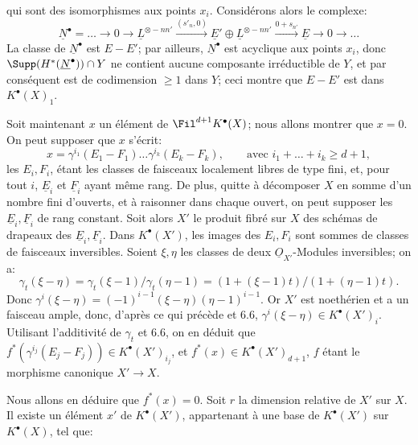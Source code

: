 
qui
sont des isomorphismes aux points $x_i$. Considérons alors le complexe:
\[
  \underline{N}^\bullet=\ldots\to0\to \underline{L}^{\otimes -nn'}
    \xrightarrow{(s'_n,0)} \underline{E}'\oplus \underline{L}^{\otimes -nn'}
    \xrightarrow{0+s_{n'}} \underline{E}\to0\to\ldots
\]
La classe de $\underline{N}^\bullet$ est $E-E'$; par ailleurs, $\underline{N}^\bullet$ est acyclique aux points $x_i$, donc $\Supp(H^*(\underline{N}^\bullet))\cap Y$ ne contient aucune composante irréductible de $Y$, et par conséquent est de codimension $\ge1$ dans $Y$; ceci montre que $E-E'$ est dans $K^{\bullet}(X)_1$.

Soit maintenant $x$ un élément de $\Fil^{d+1}K^{\bullet}(X)$; nous allons montrer que $x=0$. On peut supposer que $x$ s'écrit:
\[
  x=\gamma^{i_1}(E_1-F_1)\ldots\gamma^{i_k}(E_k-F_k),
  \qquad\text{avec } i_1+\ldots+i_k\ge d+1,
\]
les $E_i,F_i$, étant les classes de faisceaux localement libres de type fini, et, pour tout $i$, $\underline{E}_i$ et $\underline{F}_i$ ayant même rang. De plus, quitte à décomposer $X$ en somme d'un nombre fini d'ouverts, et à raisonner dans chaque ouvert, on peut supposer les $\underline{E}_i,\underline{F}_i$ de rang constant. Soit alors $X'$ le produit fibré sur $X$ des schémas de drapeaux des $\underline{E}_i,\underline{F}_i$. Dans $K^{\bullet}(X')$, les images des $E_i,F_i$ sont sommes de classes de faisceaux inversibles. Soient $\xi,\eta$ les classes de deux $\underline{O}_{X'}$-Modules inversibles; on a:
\[
  \gamma_t(\xi-\eta)=\gamma_t(\xi-1)/\gamma_t(\eta-1)
  =(1+(\xi-1)t)/(1+(\eta-1)t).
\]
Donc $\gamma^i(\xi-\eta)=(-1)^{i-1}(\xi-\eta)(\eta-1)^{i-1}$. Or $X'$ est noethérien et a un faisceau ample, donc, d'après ce qui précède et 6.6, $\gamma^i(\xi-\eta)\in K^{\bullet}(X')_i$. Utilisant l'additivité de $\gamma_t$ et 6.6, on en déduit que $f^*(\gamma^{i_j}(E_j-F_j))\in K^{\bullet}(X')_{i_j}$, et $f^*(x)\in K^{\bullet}(X')_{d+1}$, $f$ étant le morphisme canonique $X'\to X$.

Nous allons en déduire que $f^*(x)=0$. Soit $r$ la dimension relative de $X'$ sur $X$. Il existe un élément $x'$ de $K^{\bullet}(X')$, appartenant à une base de $K^{\bullet}(X')$ sur $K^{\bullet}(X)$, tel que:
